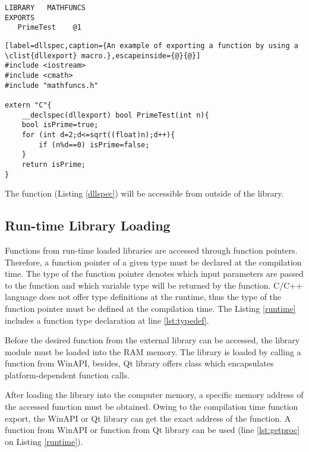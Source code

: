 \begin{lstlisting}[label=DEF,caption={A \clist{Module Definition File} of a library called ``Mathfuncs'' including a function called ``PrimeTest''.}]
LIBRARY   MATHFUNCS
EXPORTS
   PrimeTest	@1
\end{lstlisting}


\begin{lstlisting}[label=dllspec,caption={An example of exporting a function by using a \clist{dllexport} macro.},escapeinside={@}{@}]
#include <iostream>
#include <cmath>
#include "mathfuncs.h"

extern "C"{
	__declspec(dllexport) bool PrimeTest(int n){
	bool isPrime=true;
	for (int d=2;d<=sqrt((float)n);d++){
		if (n%d==0) isPrime=false;
	}
	return isPrime;
}
\end{lstlisting}

The function  (Listing \ref{dllspec}) will be accessible from outside of the library.

\subsection{Run-time Library Loading}

\label{sec:runtimeloading}

Functions from run-time loaded libraries are accessed through function pointers\cite{msdn}. Therefore, a function pointer of a given type must be declared at the compilation time. The type of the function pointer denotes which input parameters are passed to the function and which variable type will be returned by the function. C/C++ language does not offer type definitions at the runtime, thus the type of the function pointer must be defined at the compilation time. The Listing \ref{runtime} includes a function type declaration at line \ref{lst:typedef}.

Before the desired function from the external library can be accessed, the library module must be loaded into the RAM memory. The library is loaded by calling a  function from WinAPI, besides, Qt library offers  class which encapsulates platform-dependent function calls.

After loading the library into the computer memory, a specific memory address of the accessed function must be obtained. Owing to the compilation time function export, the WinAPI or Qt library can get the exact address of the function. A  function from WinAPI or  function from Qt library can be used (line \ref{lst:getproc} on Listing \ref{runtime}).

